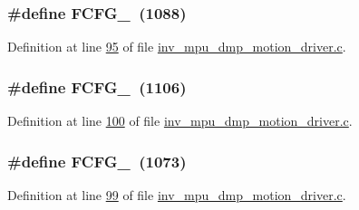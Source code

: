 \subsubsection[{\texorpdfstring{F\+C\+F\+G\+\_\+3}{FCFG_3}}]{\setlength{\rightskip}{0pt plus 5cm}\#define F\+C\+F\+G\+\_~(1088)}\hypertarget{group___d_r_i_v_e_r_s_ga68df22b3699418acab9063ee5f996d8e}{}\label{group___d_r_i_v_e_r_s_ga68df22b3699418acab9063ee5f996d8e}


Definition at line \hyperlink{inv__mpu__dmp__motion__driver_8c_source_l00095}{95} of file \hyperlink{inv__mpu__dmp__motion__driver_8c_source}{inv\+\_\+mpu\+\_\+dmp\+\_\+motion\+\_\+driver.\+c}.

\subsubsection[{\texorpdfstring{F\+C\+F\+G\+\_\+6}{FCFG_6}}]{\setlength{\rightskip}{0pt plus 5cm}\#define F\+C\+F\+G\+\_~(1106)}\hypertarget{group___d_r_i_v_e_r_s_ga2ba17b85493f082e37d7e57f45200144}{}\label{group___d_r_i_v_e_r_s_ga2ba17b85493f082e37d7e57f45200144}


Definition at line \hyperlink{inv__mpu__dmp__motion__driver_8c_source_l00100}{100} of file \hyperlink{inv__mpu__dmp__motion__driver_8c_source}{inv\+\_\+mpu\+\_\+dmp\+\_\+motion\+\_\+driver.\+c}.

\subsubsection[{\texorpdfstring{F\+C\+F\+G\+\_\+7}{FCFG_7}}]{\setlength{\rightskip}{0pt plus 5cm}\#define F\+C\+F\+G\+\_~(1073)}\hypertarget{group___d_r_i_v_e_r_s_ga687777b4390e4a84ac774cf0600abe20}{}\label{group___d_r_i_v_e_r_s_ga687777b4390e4a84ac774cf0600abe20}


Definition at line \hyperlink{inv__mpu__dmp__motion__driver_8c_source_l00099}{99} of file \hyperlink{inv__mpu__dmp__motion__driver_8c_source}{inv\+\_\+mpu\+\_\+dmp\+\_\+motion\+\_\+driver.\+c}.

